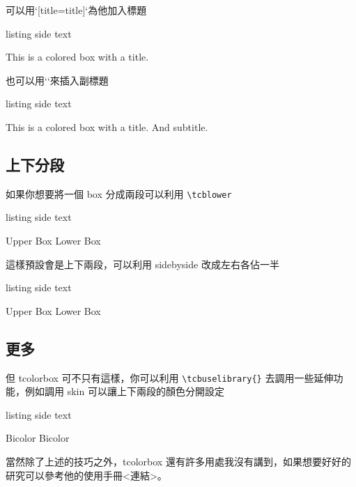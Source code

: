 可以用`[title=title]`為他加入標題

\begin{tcblisting}{listing side text}
\begin{tcolorbox}[title=Title]
This is a colored box with a title.
\end{tcolorbox}
\end{tcblisting}

也可以用``來插入副標題

\begin{tcblisting}{listing side text}
\begin{tcolorbox}[title=Title]
This is a colored box with a title.
And subtitle.
\end{tcolorbox}
\end{tcblisting}

\subsection{上下分段}

如果你想要將一個 box 分成兩段可以利用 \verb`\tcblower`

\begin{tcblisting}{listing side text}
\begin{tcolorbox}
Upper Box
\tcblower
Lower Box
\end{tcolorbox}
\end{tcblisting}

這樣預設會是上下兩段，可以利用 sidebyside 改成左右各佔一半

\begin{tcblisting}{listing side text}
\begin{tcolorbox}[sidebyside]
Upper Box
\tcblower
Lower Box
\end{tcolorbox}
\end{tcblisting}

\subsection{更多}

但 tcolorbox 可不只有這樣，你可以利用 \verb`\tcbuselibrary{}` 去調用一些延伸功能，例如調用 skin 可以讓上下兩段的顏色分開設定

\begin{tcblisting}{listing side text}
\begin{tcolorbox}[skin=bicolor, sidebyside, colback=gray!30!white,colbacklower=gray!5!white]
Bicolor
\tcblower
Bicolor
\end{tcolorbox}
\end{tcblisting}

當然除了上述的技巧之外，tcolorbox 還有許多用處我沒有講到，如果想要好好的研究可以參考他的使用手冊<連結>。
